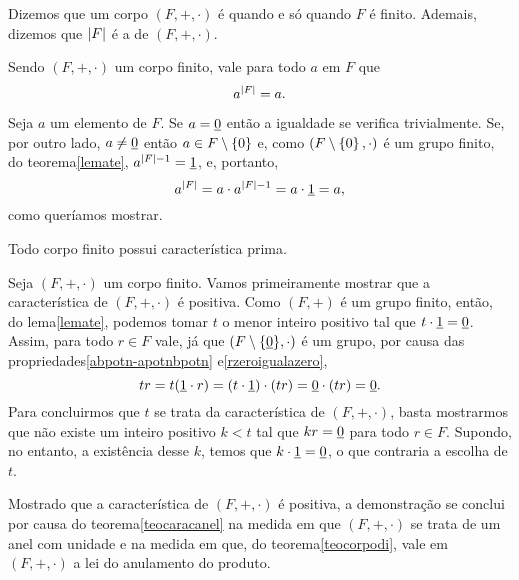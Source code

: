 \begin{Nom}
  Dizemos que um corpo $(F,+,\cdot)$ é 
  quando e só quando $F$ é finito. Ademais, dizemos que $\left| F \right|$ é a
   de $(F,+,\cdot)$.
\end{Nom}

\begin{Teo}\label{teoacardifa}
  Sendo $(F,+,\cdot)$ um corpo finito, vale para todo $a$ em $F$ que
  \begin{equation*}
    a^{\left| F \right|} = a\mathrm{.}
  \end{equation*}
\end{Teo}

\begin{dem}
  Seja $a$ um elemento de $F$. Se $a=\underline{0}$ então a igualdade se
  verifica trivialmente. Se, por outro lado, $a\neq\underline{0}$ então $a\in
  F\setminus\left\{ 0 \right\}$ e, como $(F\setminus\left\{ 0 \right\},\cdot)$ é um
  grupo finito,
  do teorema\xspace\ref{lemate}, $a^{\left| F \right|-1}=\underline{1}$, e,
  portanto,
  \begin{equation*}
    a^{\left| F \right|} = a\cdot a^{\left| F \right|-1} = a\cdot \underline{1} = a\mathrm{,}
  \end{equation*}
  como queríamos mostrar.
\end{dem}

\begin{Teo}\label{teocaracacorpo}
  Todo corpo finito possui característica prima.
\end{Teo}

\begin{dem}
  Seja $(F,+,\cdot)$ um corpo finito.
  Vamos primeiramente mostrar que a característica de $(F,+,\cdot)$ é
  positiva. Como $(F,+)$ é um grupo finito, então, do
  lema\xspace\ref{lemate},
  podemos tomar $t$ o menor inteiro
  positivo tal que $t\cdot\underline{1}=\underline{0}$. Assim, para todo $r\in F$ vale,
  já que $(F\setminus{\left\{ \underline{0}\right\}},\cdot)$ é um grupo, por causa das
  propriedades\xspace\ref{abpotn-apotnbpotn}
  e\xspace\ref{rzeroigualazero},
  \begin{equation*}
    tr = t(\underline{1}\cdot r) = (t\cdot\underline{1})\cdot(tr) = \underline{0}\cdot(tr) =
    \underline{0}\mathrm{.}
  \end{equation*}
  Para concluirmos que $t$ se trata da característica de $(F,+,\cdot)$,
  basta mostrarmos que não existe um inteiro positivo $k<t$ tal que
  $kr = \underline{0}$ para todo $r\in F$. Supondo, no entanto, a existência
  desse $k$, temos que $k\cdot\underline{1}=\underline{0}$, o que contraria a escolha de
  $t$.

  Mostrado que a característica de $(F,+,\cdot)$ é positiva, a
  demonstração se conclui por causa do teorema\xspace\ref{teocaracanel}
  na medida em que $(F,+,\cdot)$ se trata de um anel com unidade e na
  medida em que, do teorema\xspace\ref{teocorpodi}, vale em
  $(F,+,\cdot)$ a lei do anulamento do produto.
\end{dem}

